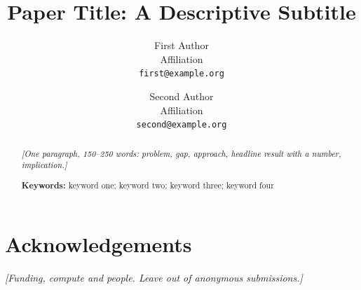 \documentclass[11pt]{article}
\title{Paper Title: A Descriptive Subtitle}
\author{First Author \\ Affiliation \\ \texttt{first@example.org}
  \and Second Author \\ Affiliation \\ \texttt{second@example.org}}
\date{}
\newcommand{\guide}[1]{{\color{gray}\itshape [#1]\par}}
\theoremstyle{definition}
\newcommand{\keywords}[1]{\par\medskip\noindent\textbf{Keywords:} #1}
\begin{document}
\maketitle

\begin{abstract}
\guide{One paragraph, 150--250 words: problem, gap, approach, headline result with a number, implication.}
\lipsum[1][1-7]
\keywords{keyword one; keyword two; keyword three; keyword four}
\end{abstract}









\section*{Acknowledgements}
\guide{Funding, compute and people. Leave out of anonymous submissions.}

\printbibliography

\appendix

\end{document}
